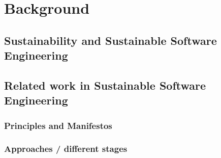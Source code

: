 \chapter{Background} %

\section{Sustainability and Sustainable Software Engineering}



\section{Related work in Sustainable Software Engineering}



\subsection{Principles and Manifestos}


\subsection{Approaches / different stages} %

